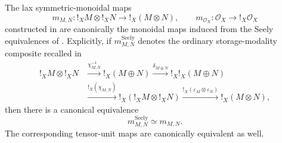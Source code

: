 \begin{proposition}
\label{prop:cofree-storage-identification}
The lax symmetric-monoidal maps
\[
    m_{M,N}:!_XM\otimes !_XN\longrightarrow !_X(M\otimes N),
    \qquad
    m_{\mathcal O_X}:\mathcal O_X\longrightarrow !_X\mathcal O_X
\]
constructed in  are canonically
the monoidal maps induced from the Seely equivalences of
. Explicitly, if
\(m^{\mathrm{Seely}}_{M,N}\) denotes the ordinary storage-modality composite
recalled in \cite[Section~2]{Lemay2021Coderelictions}
\[
\begin{aligned}
    !_XM\otimes !_XN
    &\xrightarrow{\chi^{-1}_{M,N}}
    !_X(M\oplus N)
    \xrightarrow{\delta_{M\oplus N}}
    !_X!_X(M\oplus N)
    \\
    &\xrightarrow{!_X(\chi_{M,N})}
    !_X(!_XM\otimes !_XN)
    \xrightarrow{!_X(\varepsilon_M\otimes\varepsilon_N)}
    !_X(M\otimes N),
\end{aligned}
\]
then there is a canonical equivalence
\[
    m^{\mathrm{Seely}}_{M,N}\simeq m_{M,N}.
\]
The corresponding tensor-unit maps are canonically equivalent as well.
\end{proposition}

